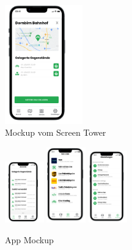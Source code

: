\begin{figure}[ht]
  \centering
  \includegraphics[width=0.3\textwidth]{images/app_mock_tower}
  \caption{Mockup vom Screen Tower}
  \label{fig:screentower}
\end{figure}

\begin{figure}[h]
  \centering
  
  \includegraphics[width=0.15\textwidth]{images/app_mock_objects}
  \includegraphics[width=0.15\textwidth]{images/app_mock_services}
  \includegraphics[width=0.15\textwidth]{images/app_mock_settings}
  \caption{App Mockup}
  \label{fig:app_mockup}
\end{figure}